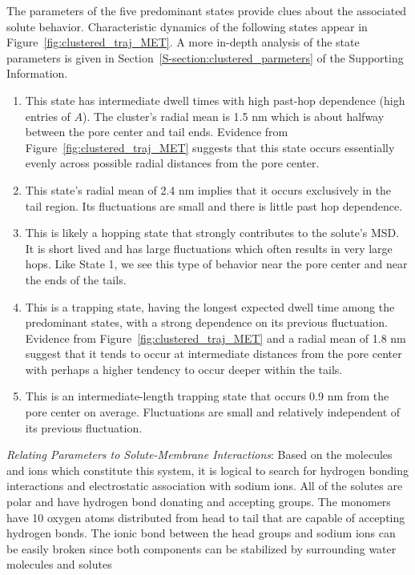 \documentclass[journal=jpcbfk,manuscript=article]{achemso}
\begin{document}
  The parameters of the five predominant states provide clues about the associated solute
  behavior. Characteristic dynamics of the following states appear in 
  Figure~\ref{fig:clustered_traj_MET}. A more in-depth analysis of the state parameters
  is given in Section~\ref{S-section:clustered_parmeters} of the Supporting Information.
  \begin{enumerate}[label={State \theenumi :}, leftmargin=3.5\parindent]
  
     \item This state has intermediate dwell times with high past-hop dependence (high
     entries of $A$). The cluster's radial mean is 1.5 nm which is about halfway between
     the pore center and tail ends. Evidence from Figure~\ref{fig:clustered_traj_MET} 
     suggests that this state occurs essentially evenly across possible radial
     distances from the pore center.
     
     \item This state's radial mean of 2.4 nm implies that it occurs exclusively in the
     tail region. Its fluctuations are small and there is little past hop dependence.
     
     \item This is likely a hopping state that strongly contributes to the solute's MSD. 
     It is short lived and has large fluctuations which often results in very large hops.
     Like State 1, we see this type of behavior near the pore center and near the ends of the tails.
     
     \item This is a trapping state, having the longest expected dwell time among the predominant
     states, with a strong dependence on its previous fluctuation. Evidence from 
     Figure~\ref{fig:clustered_traj_MET} and a radial mean of 1.8 nm suggest that 
     it tends to occur at intermediate distances from the pore center with perhaps
     a higher tendency to occur deeper within the tails.
     
     \item This is an intermediate-length trapping state that occurs 0.9 nm from the pore 
     center on average. Fluctuations are small and relatively independent of its previous 
     fluctuation.
     
  \end{enumerate}
   
  \textit{Relating Parameters to Solute-Membrane Interactions}: Based on the
  molecules and ions which constitute this system, it is logical to search for hydrogen 
  bonding interactions and electrostatic association with sodium ions. All of 
  the solutes are polar and have hydrogen bond donating and accepting groups. The monomers 
  have 10 oxygen atoms distributed from head to tail that are capable of 
  accepting hydrogen bonds. The ionic bond between the head groups and sodium ions 
  can be easily broken since both components can be stabilized by surrounding 
  water molecules and solutes 
\end{document}
